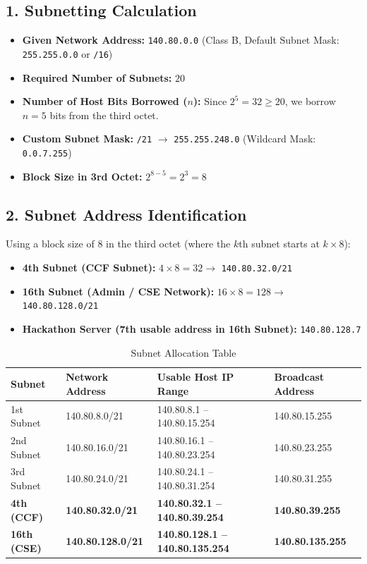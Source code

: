 \documentclass[12pt, a4paper]{report}
\begin{document}
\subsection*{1. Subnetting Calculation}
\begin{itemize}
	\item \textbf{Given Network Address:} \texttt{140.80.0.0} (Class B, Default Subnet Mask: \texttt{255.255.0.0} or \texttt{/16})
	\item \textbf{Required Number of Subnets:} $20$
	\item \textbf{Number of Host Bits Borrowed ($n$):} Since $2^5 = 32 \ge 20$, we borrow $n = 5$ bits from the third octet.
	\item \textbf{Custom Subnet Mask:} \texttt{/21} $\rightarrow$ \texttt{255.255.248.0} (Wildcard Mask: \texttt{0.0.7.255})
	\item \textbf{Block Size in 3rd Octet:} $2^{8 - 5} = 2^3 = 8$
\end{itemize}

\subsection*{2. Subnet Address Identification}
Using a block size of $8$ in the third octet (where the $k$th subnet starts at $k \times 8$):
\begin{itemize}
	\item \textbf{4th Subnet (CCF Subnet):} $4 \times 8 = 32 \rightarrow$ \texttt{140.80.32.0/21}
	\item \textbf{16th Subnet (Admin / CSE Network):} $16 \times 8 = 128 \rightarrow$ \texttt{140.80.128.0/21}
	\item \textbf{Hackathon Server (7th usable address in 16th Subnet):} \texttt{140.80.128.7}
\end{itemize}

\begin{table}[H]
	\centering
	\begin{tabular}{|l|l|l|l|}
		\hline
		\textbf{Subnet} & \textbf{Network Address} & \textbf{Usable Host IP Range} & \textbf{Broadcast Address} \\ \hline
		1st Subnet          & 140.80.8.0/21   & 140.80.8.1 -- 140.80.15.254     & 140.80.15.255  \\ \hline
		2nd Subnet          & 140.80.16.0/21  & 140.80.16.1 -- 140.80.23.254    & 140.80.23.255  \\ \hline
		3rd Subnet          & 140.80.24.0/21  & 140.80.24.1 -- 140.80.31.254    & 140.80.31.255  \\ \hline
		\textbf{4th (CCF)}  & \textbf{140.80.32.0/21}  & \textbf{140.80.32.1 -- 140.80.39.254}   & \textbf{140.80.39.255}  \\ \hline
		\textbf{16th (CSE)} & \textbf{140.80.128.0/21} & \textbf{140.80.128.1 -- 140.80.135.254} & \textbf{140.80.135.255} \\ \hline
	\end{tabular}
	\caption{Subnet Allocation Table}
\end{table}
\end{document}
